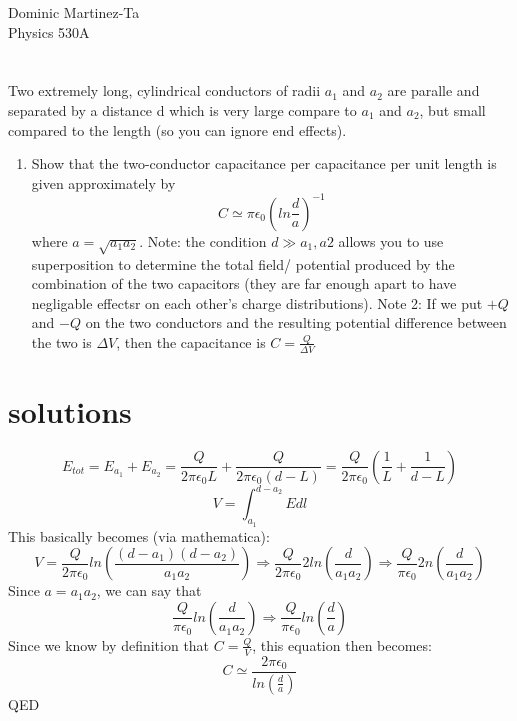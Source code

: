 \documentclass{article}
\begin{document}
Dominic Martinez-Ta\\
Physics 530A
\section{}
Two extremely long, cylindrical conductors of radii $a_1$ and $a_2$ are paralle and separated by a distance d which is very large compare to $a_1$ and $a_2$, but small compared to the length (so you can ignore end effects).
\begin{enumerate}
\item Show that the two-conductor capacitance per capacitance per unit length is given approximately by 
\begin{equation}
C \simeq \pi \epsilon_0 (ln\frac{d}{a})^{-1}
\end{equation}
where $a = \sqrt{a_1a_2}$.
Note: the condition  $d \gg a_1, a2$ allows you to use superposition to determine the total field/ potential produced by the combination of the two capacitors (they are far enough apart to have negligable effectsr on each other's charge distributions). 
Note 2: If we put $+Q$ and $-Q$ on the two conductors and the resulting potential difference between the two is $\Delta V$, then the capacitance is $C=\frac{Q}{\Delta V}$
\end{enumerate}
\section{solutions}
\begin{equation}
E_{tot} = E_{a_1} + E_{a_2} = \frac{Q}{2\pi\epsilon_0 L} + \frac{Q}{2\pi\epsilon_0 (d-L)} = \frac{Q}{2\pi\epsilon_0}(\frac{1}{L}+\frac{1}{d-L})
\end{equation}
\begin{equation}
V = \int_{a_1}^{d-a_2}E dl
\end{equation}
This basically becomes (via mathematica):
\begin{equation}
V = \frac{Q}{2\pi\epsilon_0}ln(\frac{(d-a_1)(d-a_2)}{a_1a_2}) \Rightarrow \frac{Q}{2\pi\epsilon_0}2ln(\frac{d}{a_1a_2})\Rightarrow \frac{Q}{\pi\epsilon_0}2n(\frac{d}{a_1a_2})
\end{equation}
Since $a = a_1a_2$, we can say that
\begin{equation}
 \frac{Q}{\pi\epsilon_0}ln(\frac{d}{a_1a_2})\Rightarrow \frac{Q}{\pi\epsilon_0}ln(\frac{d}{a})
\end{equation}
Since we know by definition that $C = \frac{Q}{V}$, this equation then becomes:
\begin{equation}
C \simeq \frac{2\pi\epsilon_0}{ln(\frac{d}{a})}
\end{equation}
QED
\end{document}
